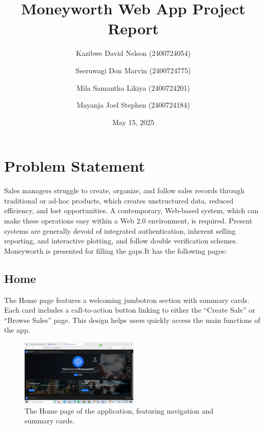 \documentclass[12pt]{article}
\title{Moneyworth Web App Project Report}
\author{Kazibwe David Nelson (2400724054) \and Sseruwagi Don Marvin (2400724775) \and Mila Samantha Likiya (2400724201) \and Mayanja Joel Stephen (2400724184)}
\date{May 15, 2025}
\begin{document}
\maketitle

\section{Problem Statement}
Sales managers struggle to create, organize, and follow sales records through traditional or ad-hoc products, which creates unstructured data, reduced efficiency, and lost opportunities. A contemporary, Web-based system, which can make these operations easy within a Web 2.0 environment, is required. Present systems are generally devoid of integrated authentication, inherent selling reporting, and interactive plotting, and follow double verification schemes. Moneyworth is presented for filling the gaps.It has the following pages:

\subsection{Home}
The Home page features a welcoming jumbotron section with summary cards. Each card includes a call-to-action button linking to either the ``Create Sale'' or ``Browse Sales'' page. This design helps users quickly access the main functions of the app.
\begin{figure}[H]
    \centering
    \includegraphics[width=0.5\textwidth]{home.png}
    \caption{The Home page of the application, featuring navigation and summary cards.}
\end{figure}
\end{document}
